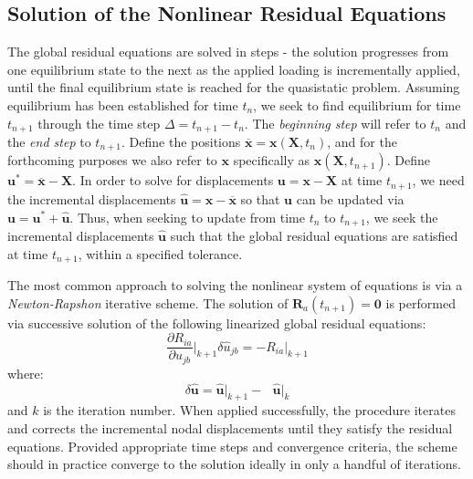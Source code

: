 \subsection{Solution of the Nonlinear Residual Equations}

The global residual equations are solved in steps - the solution progresses from one equilibrium state to the next as the applied loading is incrementally applied, until the final equilibrium state is reached for the quasistatic problem. Assuming equilibrium has been established for time $t_n$, we seek to find equilibrium for time $t_{n+1}$ through the time step $\Delta = t_{n+1} - t_{n}$. The \textit{beginning step} will refer to $t_n$ and the \textit{end step} to $t_{n+1}$. Define the positions $\overline{\bm{x}} = \bm{x}(\bm{X},t_n)$, and for the forthcoming purposes we also refer to ${\bm{x}}$ specifically as $\bm{x}(\bm{X},t_{n+1})$. Define ${\bm{u}}^* = \overline{\bm{x}} - \bm{X}$. In order to solve for displacements $\bm{u} = \bm{x} - \bm{X}$ at time $t_{n+1}$, we need the incremental displacements $\hat{\bm{u}} = \bm{x} - \overline{\bm{x}}$ so that $\bm{u}$ can be updated via $\bm{u} = {\bm{u}}^* + \hat{\bm{u}}$. Thus, when seeking to update from time $t_n$ to $t_{n+1}$, we seek the incremental displacements $\hat{\bm{u}}$ such that the global residual equations are satisfied at time $t_{n+1}$, within a specified tolerance.

The most common approach to solving the nonlinear system of equations is via a \textit{Newton-Rapshon} iterative scheme. The solution of $\bm{R}_a(t_{n+1}) = \bm{0}$ is performed via successive solution of the following linearized global residual equations:
\begin{equation}
\frac{\partial R_{ia}}{\partial \hat{u}_{jb}} \bigg|_{k+1} \delta\hat{u}_{jb} = -R_{ia}\bigg|_{k+1}
\label{eqn:newtonraphson}
\end{equation}
where:
\begin{equation}
\delta\hat{\bm{u}} = \hat{\bm{u}}\big|_{k+1} - \text{\ }\hat{\bm{u}}\big|_k
\end{equation}
and $k$ is the iteration number. When applied successfully, the procedure iterates and corrects the incremental nodal displacements until they satisfy the residual equations. Provided appropriate time steps and convergence criteria, the scheme should in practice converge to the solution ideally in only a handful of iterations.

